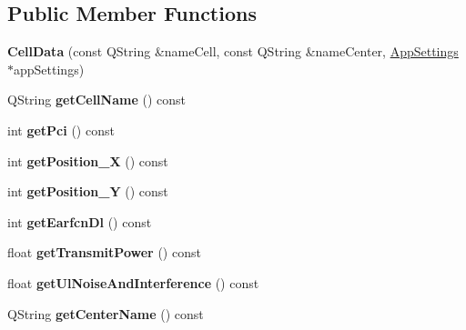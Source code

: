 \subsection*{Public Member Functions}
\begin{DoxyCompactItemize}
\item 
{\bfseries Cell\+Data} (const Q\+String \&name\+Cell, const Q\+String \&name\+Center, \hyperlink{class_app_settings}{App\+Settings} $\ast$app\+Settings)\hypertarget{class_cell_data_a1187ace2572657fed666a6c5991c9464}{}\label{class_cell_data_a1187ace2572657fed666a6c5991c9464}

\item 
Q\+String {\bfseries get\+Cell\+Name} () const \hypertarget{class_cell_data_ade531de6af31b76efea6bb1cf836318d}{}\label{class_cell_data_ade531de6af31b76efea6bb1cf836318d}

\item 
int {\bfseries get\+Pci} () const \hypertarget{class_cell_data_aca22793b0d73d0e6e052f505244b07c8}{}\label{class_cell_data_aca22793b0d73d0e6e052f505244b07c8}

\item 
int {\bfseries get\+Position\+\_\+X} () const \hypertarget{class_cell_data_acd460d39595e0c940b8a6a0d0f8c043d}{}\label{class_cell_data_acd460d39595e0c940b8a6a0d0f8c043d}

\item 
int {\bfseries get\+Position\+\_\+Y} () const \hypertarget{class_cell_data_aa1488703bc627613d01538d80152ca03}{}\label{class_cell_data_aa1488703bc627613d01538d80152ca03}

\item 
int {\bfseries get\+Earfcn\+Dl} () const \hypertarget{class_cell_data_a759b5347060d91d78f7217f7d80295a4}{}\label{class_cell_data_a759b5347060d91d78f7217f7d80295a4}

\item 
float {\bfseries get\+Transmit\+Power} () const \hypertarget{class_cell_data_a91796a405772ed93ff2629fe75e96c7c}{}\label{class_cell_data_a91796a405772ed93ff2629fe75e96c7c}

\item 
float {\bfseries get\+Ul\+Noise\+And\+Interference} () const \hypertarget{class_cell_data_a467c43df76462ba8ddee25d83c40881d}{}\label{class_cell_data_a467c43df76462ba8ddee25d83c40881d}

\item 
Q\+String {\bfseries get\+Center\+Name} () const \hypertarget{class_cell_data_af6b4d67e3c018bb74c621cc75798d469}{}\label{class_cell_data_af6b4d67e3c018bb74c621cc75798d469}


\end{DoxyCompactItemize}

